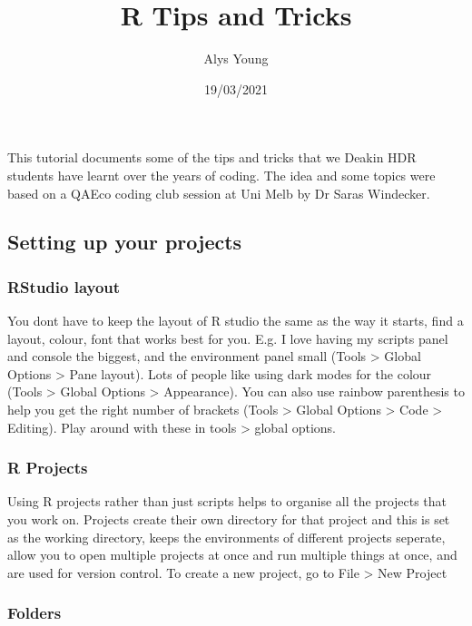 \documentclass[
]{article}
\title{R Tips and Tricks}
\author{Alys Young}
\date{19/03/2021}
\begin{document}
\maketitle

This tutorial documents some of the tips and tricks that we Deakin HDR
students have learnt over the years of coding. The idea and some topics
were based on a QAEco coding club session at Uni Melb by Dr Saras
Windecker.

\hypertarget{setting-up-your-projects}{%
\subsection{Setting up your projects}\label{setting-up-your-projects}}

\hypertarget{rstudio-layout}{%
\subsubsection{RStudio layout}\label{rstudio-layout}}

You dont have to keep the layout of R studio the same as the way it
starts, find a layout, colour, font that works best for you. E.g. I love
having my scripts panel and console the biggest, and the environment
panel small (Tools \textgreater{} Global Options \textgreater{} Pane
layout). Lots of people like using dark modes for the colour (Tools
\textgreater{} Global Options \textgreater{} Appearance). You can also
use rainbow parenthesis to help you get the right number of brackets
(Tools \textgreater{} Global Options \textgreater{} Code \textgreater{}
Editing). Play around with these in tools \textgreater{} global options.

\hypertarget{r-projects}{%
\subsubsection{R Projects}\label{r-projects}}

Using R projects rather than just scripts helps to organise all the
projects that you work on. Projects create their own directory for that
project and this is set as the working directory, keeps the environments
of different projects seperate, allow you to open multiple projects at
once and run multiple things at once, and are used for version control.
To create a new project, go to File \textgreater{} New Project

\hypertarget{folders}{%
\subsubsection{Folders}\label{folders}}
\end{document}
